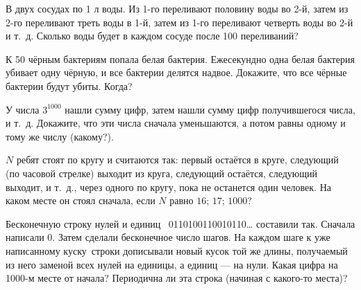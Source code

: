 \documentclass[a4paper,12pt]{article}
\begin{document}


В двух сосудах по 1 л воды.
Из 1-го переливают половину воды во 2-й,
затем из 2-го переливают треть воды в
1-й, затем из 1-го переливают четверть воды во 2-й и т.~д.
Сколько воды будет в каждом сосуде после 100 переливаний?


К 50 чёрным бактериям попала белая бактерия.
Ежесекундно одна белая бактерия убивает одну чёрную, %
и все бактерии делятся надвое. Докажите, что %
все чёрные бактерии будут убиты. %
Когда?

У числа $3^{1000}$ нашли сумму цифр, затем нашли сумму цифр получившегося числа, и т.~д.
Докажите, что эти числа сначала
уменьшаются, %
а потом равны одному и тому же числу (какому?). %

$N$ ребят стоят по кругу и считаются так: первый остаётся в круге, следующий
(по часовой стрелке) выходит из круга, следующий %
остаётся, следующий выходит, и т.~д., через одного по кругу, пока не останется один человек.
На каком месте он стоял сначала, если $N$ равно
 $16$; %
 $17$; %
 $1000$?


Бесконечную строку нулей и единиц ~\hbox{0110100110010110\dots}
составили так. Сначала написали 0.
Затем сделали бесконечное число шагов.
На каждом шаге к уже написанному куску~строки %
дописывали новый кусок той же длины, получаемый из него
заменой всех нулей на единицы, а единиц --- на нули.
 Какая цифра на 1000-м месте от начала?
 Периодична ли  эта строка (начиная с какого-то места)?
\end{document}
